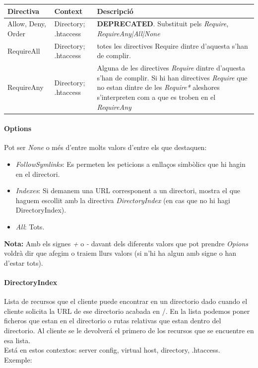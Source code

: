 \documentclass[a4paper, 11pt]{article}
\begin{document}
\begin{tabular}{|p{4cm}|p{3cm}|p{5cm}|}
\hline
\textbf{Directiva} & \textbf{Context} & \textbf{Descripció} \\
\hline
Allow, Deny, Order & Directory; .htaccess& \textbf{DEPRECATED}. Substituit pels \textit{Require}, \textit{RequireAny|All|None} \\
\hline
RequireAll & Directory; .htaccess & totes les directives Require dintre d'aquesta s'han de complir. \\
\hline
RequireAny & Directory; .htaccess & Alguna de les directives \textit{Require} dintre d'aquesta s'han de complir. Si hi han directives \textit{Require} que no estan dintre de les \textit{Require*} aleshores s'interpreten com a que es troben en el \textit{RequireAny}\\
\hline
\end{tabular}

\paragraph{Options}
Pot ser \textit{None} o m\'es d'entre molts valors d'entre els que destaquen:

\begin{itemize}
	\item \textit{FollowSymlinks}: Es permeten les peticions a enllaços simbòlics que hi hagin en el directori.
	\item \textit{Indexes}: Si demanem una URL corresponent a un directori, mostra el que haguem escollit amb la directiva \textit{DirectoryIndex} (en cas que no hi hagi DirectoryIndex).
	\item \textit{All}: Tots.
\end{itemize}

\textbf{Nota:} Amb els signes \textit{+} o \textit{-} davant dels diferents valors que pot prendre \textit{Opions} voldrà dir que afegim o traiem llurs valors (si n'hi ha algun amb signe o han d'estar tots).

\paragraph{DirectoryIndex}

Lista de recursos que el cliente puede encontrar en un directorio dado cuando el cliente solicita la URL de ese directorio acabada en \slash. En la lista podemos poner ficheros que estan en el directorio o rutas relativas que estan dentro del directorio. Al cliente se le devolverá el primero de los recursos que se encuentre en esa lista.\\
Está en estos contextos: server config, virtual host, directory, .htaccess.\\
Exemple: 
\end{document}
